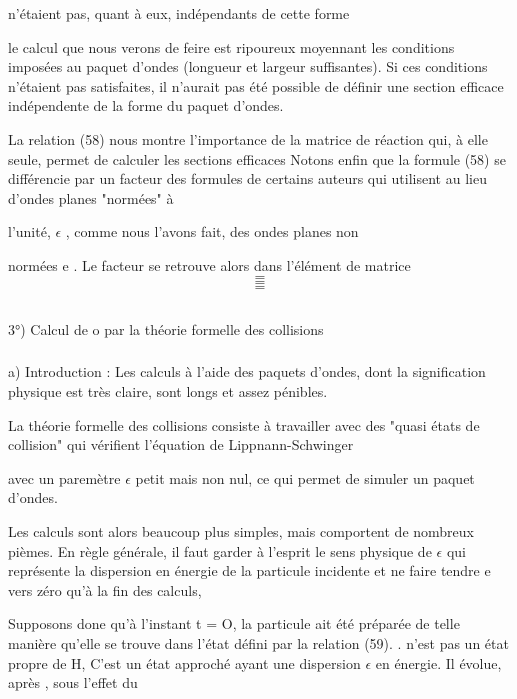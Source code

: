 {{{ n'étaient pas, quant à eux, indépendants de cette forme

le calcul que nous verons de feire est ripoureux moyennant les
conditions imposées au paquet d'ondes (longueur et largeur suffisantes).
Si ces conditions n'étaient pas satisfaites, il n'aurait pas été possible de
définir une section efficace indépendente de la forme du paquet d'ondes.

La relation (58) nous montre l'importance de la matrice  de
réaction qui, à elle seule, permet de calculer les sections efficaces
Notons enfin que la formule (58) se différencie par un facteur  des formules de
certains auteurs qui utilisent au lieu d'ondes planes "normées" à

l'unité,  $\epsilon$ , comme nous l'avons fait, des ondes planes non

normées e . Le facteur  se retrouve alors dans l'élément de
matrice
\[
\tag{59}=
\]
\[
\tag{60}=
\]
\[
\tag{61}=
\]

\subsection{}%
3°) Calcul de o par la théorie formelle des collisions

\subsubsection{}%
a) Introduction : Les calculs à l'aide des paquets d'ondes,
dont la signification physique est très claire, sont longs et assez pénibles.

La théorie formelle des collisions consiste à travailler avec
des "quasi états de collision"  qui vérifient l'équation de
Lippnann-Schwinger

avec un paremètre $\epsilon$ petit mais non nul, ce qui permet de simuler un paquet
d'ondes.

Les calculs sont alors beaucoup plus simples, mais comportent de
nombreux pièmes. En règle générale, il faut garder à l'esprit le sens physique
de $\epsilon$ qui représente la dispersion en énergie de la particule incidente
et ne faire tendre e vers zéro qu'à la fin des calculs,

Supposons done qu'à l'instant t = O, la particule ait été préparée
de telle manière qu'elle se trouve dans l'état  défini par la relation (59). .
n'est pas un état propre de H, C'est un état approché
ayant une dispersion $\epsilon$ en énergie. Il évolue, après , sous l'effet du

}}}
